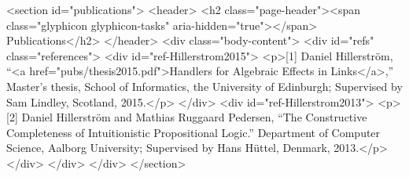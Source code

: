       <section id="publications">
	<header>
	  <h2 class="page-header"><span class="glyphicon glyphicon-tasks" aria-hidden="true"></span> Publications</h2>
	</header>
	<div class="body-content">
	  <div id="refs" class="references">
<div id="ref-Hillerstrom2015">
<p>[1] Daniel Hillerström, “<a href="pubs/thesis2015.pdf">Handlers for Algebraic Effects in Links</a>,” Master’s thesis, School of Informatics, the University of Edinburgh; Supervised by Sam Lindley, Scotland, 2015.</p>
</div>
<div id="ref-Hillerstrom2013">
<p>[2] Daniel Hillerström and Mathias Ruggaard Pedersen, “The Constructive Completeness of Intuitionistic Propositional Logic.” Department of Computer Science, Aalborg University; Supervised by Hans Hüttel, Denmark, 2013.</p>
</div>
</div>
	</div>
      </section>
